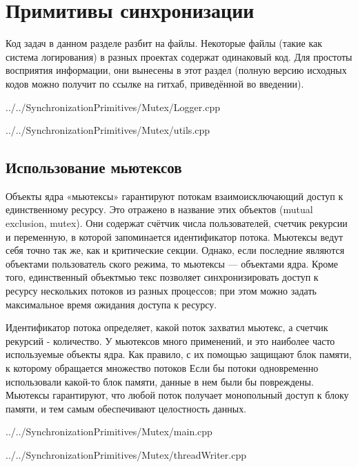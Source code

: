 \documentclass[a4paper, 12pt]{article}		%
\begin{document}
\newpage
\section{Примитивы синхронизации}

Код задач в данном разделе разбит на файлы. Некоторые файлы (такие как система логирования) в разных проектах содержат одинаковый код. Для простоты восприятия информации, они вынесены в этот раздел (полную версию исходных кодов можно получит по ссылке на гитхаб, приведённой во введении).


{../../SynchronizationPrimitives/Mutex/Logger.cpp}


{../../SynchronizationPrimitives/Mutex/utils.cpp}

\newpage
\subsection{Использование мьютексов}

Объекты ядра «мьютексы» гарантируют потокам взаимоисключающий доступ к единственному ресурсу. Это отражено в название этих объектов (mutual exclusion, mutex). Они содержат счётчик числа пользователей, счетчик рекурсии и переменную, в которой запоминается идентификатор потока. Мьютексы ведут себя точно так же, как и критические секции. Однако, если последние являются объектами пользователь ского режима, то мьютексы — объектами ядра. Кроме того, единственный объектмью текс позволяет синхронизировать доступ к ресурсу нескольких потоков из разных процессов; при этом можно задать максимальное время ожидания доступа к ресурсу.

Идентификатор потока определяет, какой поток захватил мьютекс, а счетчик рекурсий - количество. У мьютексов много применений, и это наиболее часто используемые объекты ядра. Как правило, с их помощью защищают блок памяти, к которому обращается множество потоков Если бы потоки одновременно использовали какой-то блок памяти, данные в нем были бы повреждены. Мьютексы гарантируют, что любой поток получает монопольный доступ к блоку памяти, и тем самым обеспечивают целостность данных.


{../../SynchronizationPrimitives/Mutex/main.cpp}


{../../SynchronizationPrimitives/Mutex/threadWriter.cpp}
\end{document}
